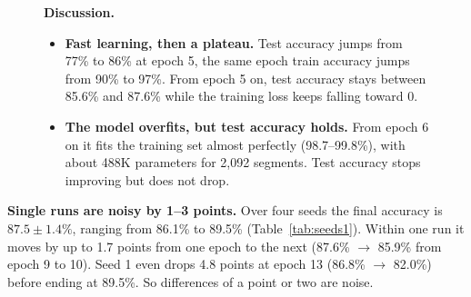 \documentclass[11pt]{article}
\begin{document}
\begin{figure}[H]
\centering
\begin{minipage}[c]{0.42\linewidth}
\centering
{}
\label{fig:p1}
\end{minipage}\hfill
\begin{minipage}[c]{0.54\linewidth}
\textbf{Discussion.}
\begin{itemize}
  \item \textbf{Fast learning, then a plateau.} Test accuracy jumps from 77\% to 86\% at epoch 5, the same epoch train accuracy jumps from 90\% to 97\%. From epoch 5 on, test accuracy stays between 85.6\% and 87.6\% while the training loss keeps falling toward 0.
  \item \textbf{The model overfits, but test accuracy holds.} From epoch 6 on it fits the training set almost perfectly (98.7--99.8\%), with about 488K parameters for 2{,}092 segments. Test accuracy stops improving but does not drop.
\end{itemize}
\end{minipage}
\end{figure}

\textbf{Single runs are noisy by 1--3 points.} Over four seeds the final accuracy is $87.5 \pm 1.4\%$, ranging from 86.1\% to 89.5\% (Table~\ref{tab:seeds1}). Within one run it moves by up to 1.7 points from one epoch to the next (87.6\% $\rightarrow$ 85.9\% from epoch 9 to 10). Seed 1 even drops 4.8 points at epoch 13 (86.8\% $\rightarrow$ 82.0\%) before ending at 89.5\%. So differences of a point or two are noise.
\end{document}
